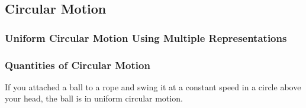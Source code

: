 \documentclass[../main-physics-problems.tex]{subfiles}
\begin{document}
\clearpage

\subsection{Circular Motion}

\subsubsection{Uniform Circular Motion Using Multiple Representations}

\subsubsection{Quantities of Circular Motion}




\begin{questions}




\question
If you attached a ball to a rope and swing it at a constant speed in a circle above your head, the ball is in uniform circular motion.

\end{questions}
\end{document}
